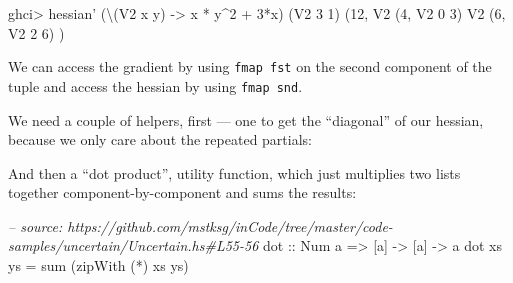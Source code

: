 \documentclass[]{article}
\newenvironment{Shaded}{}{}
\newcommand{\KeywordTok}[1]{\textcolor[rgb]{0.00,0.44,0.13}{\textbf{{#1}}}}
\newcommand{\DataTypeTok}[1]{\textcolor[rgb]{0.56,0.13,0.00}{{#1}}}
\newcommand{\DecValTok}[1]{\textcolor[rgb]{0.25,0.63,0.44}{{#1}}}
\newcommand{\CommentTok}[1]{\textcolor[rgb]{0.38,0.63,0.69}{\textit{{#1}}}}
\newcommand{\OtherTok}[1]{\textcolor[rgb]{0.00,0.44,0.13}{{#1}}}
\newcommand{\FunctionTok}[1]{\textcolor[rgb]{0.02,0.16,0.49}{{#1}}}
\newcommand{\NormalTok}[1]{{#1}}
\begin{document}
\begin{Shaded}
\begin{Highlighting}[]
\NormalTok{ghci}\FunctionTok{>} \NormalTok{hessian' (\textbackslash{}(}\DataTypeTok{V2} \NormalTok{x y) }\OtherTok{->} \NormalTok{x }\FunctionTok{*} \NormalTok{y}\FunctionTok{^}\DecValTok{2} \FunctionTok{+} \DecValTok{3}\FunctionTok{*}\NormalTok{x) (}\DataTypeTok{V2} \DecValTok{3} \DecValTok{1}\NormalTok{)}
\NormalTok{(}\DecValTok{12}\NormalTok{, }\DataTypeTok{V2} \NormalTok{(}\DecValTok{4}\NormalTok{, }\DataTypeTok{V2} \DecValTok{0} \DecValTok{3}\NormalTok{)}
     \DataTypeTok{V2} \NormalTok{(}\DecValTok{6}\NormalTok{, }\DataTypeTok{V2} \DecValTok{2} \DecValTok{6}\NormalTok{)}
\NormalTok{)}
\end{Highlighting}
\end{Shaded}

We can access the gradient by using \texttt{fmap\ fst} on the second component
of the tuple and access the hessian by using \texttt{fmap\ snd}.

We need a couple of helpers, first --- one to get the ``diagonal'' of our
hessian, because we only care about the repeated partials:

\begin{Shaded}
\end{Shaded}

And then a ``dot product'', utility function, which just multiplies two lists
together component-by-component and sums the results:

\begin{Shaded}
\begin{Highlighting}[]
\CommentTok{-- source: https://github.com/mstksg/inCode/tree/master/code-samples/uncertain/Uncertain.hs#L55-56}
\OtherTok{dot ::} \DataTypeTok{Num} \NormalTok{a }\OtherTok{=>} \NormalTok{[a] }\OtherTok{->} \NormalTok{[a] }\OtherTok{->} \NormalTok{a}
\NormalTok{dot xs ys }\FunctionTok{=} \NormalTok{sum (zipWith (}\FunctionTok{*}\NormalTok{) xs ys)}
\end{Highlighting}
\end{Shaded}
\end{document}
